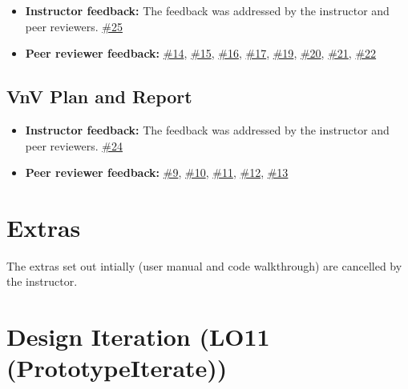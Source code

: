 \documentclass{article}
\begin{document}
\begin{itemize}
    \item \textbf{Instructor feedback:} The feedback was addressed by the instructor and peer reviewers. \href{https://github.com/zhangwenchili/CAS741-EelbrainPipeline/issues/25}{\#25}
    \item \textbf{Peer reviewer feedback:} \href{https://github.com/zhangwenchili/CAS741-EelbrainPipeline/issues/14}{\#14}, \href{https://github.com/zhangwenchili/CAS741-EelbrainPipeline/issues/15}{\#15}, \href{https://github.com/zhangwenchili/CAS741-EelbrainPipeline/issues/16}{\#16}, \href{https://github.com/zhangwenchili/CAS741-EelbrainPipeline/issues/17}{\#17}, \href{https://github.com/zhangwenchili/CAS741-EelbrainPipeline/issues/19}{\#19}, \href{https://github.com/zhangwenchili/CAS741-EelbrainPipeline/issues/20}{\#20}, \href{https://github.com/zhangwenchili/CAS741-EelbrainPipeline/issues/21}{\#21}, \href{https://github.com/zhangwenchili/CAS741-EelbrainPipeline/issues/22}{\#22}
  \end{itemize}

\subsection{VnV Plan and Report}

\begin{itemize}
    \item \textbf{Instructor feedback:} The feedback was addressed by the instructor and peer reviewers. \href{https://github.com/zhangwenchili/CAS741-EelbrainPipeline/issues/24}{\#24}
    \item \textbf{Peer reviewer feedback:} \href{https://github.com/zhangwenchili/CAS741-EelbrainPipeline/issues/9}{\#9}, \href{https://github.com/zhangwenchili/CAS741-EelbrainPipeline/issues/10}{\#10}, \href{https://github.com/zhangwenchili/CAS741-EelbrainPipeline/issues/11}{\#11}, \href{https://github.com/zhangwenchili/CAS741-EelbrainPipeline/issues/12}{\#12}, \href{https://github.com/zhangwenchili/CAS741-EelbrainPipeline/issues/13}{\#13}
  \end{itemize}

\section{Extras}

The extras set out intially (user manual and code walkthrough) are cancelled by the instructor.

\section{Design Iteration (LO11 (PrototypeIterate))}
\end{document}
